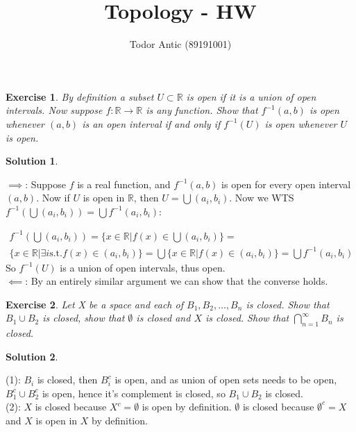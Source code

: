 \documentclass[11pt,a4paper]{article}
\title{Topology - HW}
\author{Todor Antic (89191001)}
\newtheorem{Ex}{Exercise}
\newtheorem{Sol}{Solution}
\begin{document}
\maketitle

\begin{Ex}
	By definition a subset $U \subset \mathbb{R}$ is open if it is a union of open intervals. Now suppose $f: \mathbb{R} \rightarrow \mathbb{R}$ is any function. Show that $f^{-1}(a,b)$ is open whenever $(a,b)$ is an open interval if and only if $f^{-1}(U)$ is open whenever $U$ is open.
\end{Ex}

\begin{Sol}
\end{Sol}

\noindent$\implies$: Suppose $f$ is a real function, and $f^{-1}(a,b)$ is open for every open interval $(a,b)$. Now if $U$ is open in $\mathbb{R}$, then $U = \bigcup (a_i,b_i)$.
Now we WTS $f^{-1}(\bigcup (a_i,b_i)) = \bigcup f^{-1}(a_i,b_i)$:

\begin{gather}\nonumber
f^{-1}(\bigcup (a_i,b_i)) = \{x \in \mathbb{R}| f(x) \in \bigcup(a_i,b_i)\} =\\ \nonumber \{x \in \mathbb{R}| \exists i \text{s.t.} f(x) \in (a_i, b_i)\} = \bigcup\{x \in \mathbb{R}| f(x) \in (a_i,b_i) \} = \bigcup f^{-1}(a_i,b_i)
\end{gather}
So $f^{-1}(U)$ is a union of open intervals, thus open. \\

\noindent $\impliedby$: By an entirely similar argument we can show that the converse holds.

\begin{Ex} Let X be a space and each of $B_1, B_2 , \dots , B_n$ is closed. Show that $B_1 \cup B_2$ is closed, show that $\emptyset$ is closed and $X$ is closed. Show that $\bigcap_{n=1}^\infty B_n$ is closed.
\end{Ex}

\begin{Sol}\end{Sol}
\noindent(1): $B_i$ is closed, then $B_i^c$ is open, and as union of open sets needs to be open, $B_1^c \cup B_2^c$ is open, hence it's complement is closed, so $B_1 \cup B_2$ is closed. \\

\noindent(2): $X$ is closed because $X^c = \emptyset$ is open by definition. $\emptyset$ is closed because $\emptyset^c = X$ and $X$ is open in $X$ by definition.\\ 
\end{document}

